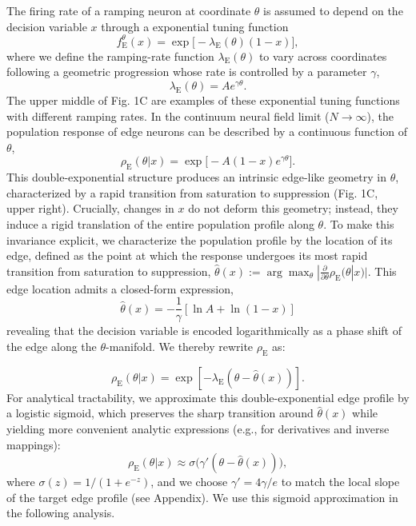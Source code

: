 \documentclass{article}
\newcommand{\rhoE}{\rho_{\text{E}}}
\newcommand{\lambdaE}{\lambda_{\text{E}}}
\newcommand{\gammaSig}{\gamma'}
\begin{document}
 The firing rate of a ramping neuron at coordinate $\theta$ is assumed to depend on the decision variable $x$ through a exponential tuning function
\begin{equation}
    f_{\text{E}}^{\theta}(x)=\exp\!\bigl[-\lambdaE(\theta)(1-x)\bigr],
\end{equation}
where we define the ramping-rate function $\lambdaE(\theta)$ to vary across coordinates following a geometric progression whose rate is controlled by a parameter $\gamma$,
\begin{equation}
   \lambdaE(\theta)=Ae^{\gamma\theta} \label{geometric progression}.
\end{equation}
The upper middle of Fig. 1C are examples of these exponential tuning functions with different ramping rates.
In the continuum neural field limit ($N\to \infty$), the population response of edge neurons can be described by a continuous function of $\theta$,
\begin{equation}
\rhoE(\theta|x)=\exp\!\bigl[-A(1-x)e^{\gamma\theta}\bigr].
\end{equation}
This double-exponential structure produces an intrinsic edge-like geometry in $\theta$, characterized by a rapid transition from saturation to suppression (Fig. 1C, upper right). Crucially, changes in $x$ do not deform this geometry; instead, they induce a rigid translation of the entire population profile along $\theta$. To make this invariance explicit, we characterize the population profile by the location of its edge, defined as the point at which the response undergoes its most rapid transition from saturation to suppression, $\hat{\theta}(x) :=\arg\max_{\theta}|\frac{\partial}{\partial \theta}\rhoE(\theta|x)|$. This edge location admits a closed-form expression,
\begin{equation}
\hat{\theta}(x) = -\frac1\gamma \left[\ln A + \ln(1-x)\right]\label{nonlinear mapping}
\end{equation}
revealing that the decision variable is encoded logarithmically as a phase shift of the edge along the $\theta$-manifold. We thereby rewrite $\rhoE$ as:

\begin{equation}
    \rhoE(\theta|x) = \exp\left[-\lambdaE(\theta-\hat{\theta}(x))\right]. 
\end{equation}
For analytical tractability, we approximate this double-exponential edge profile by a logistic sigmoid, which preserves the sharp transition around $\hat{\theta}(x)$ while yielding more convenient analytic expressions (e.g., for derivatives and inverse mappings):
\begin{equation}
    \rhoE(\theta|x) \approx \sigma\bigl(\gammaSig(\theta-\hat{\theta}(x))\bigr), \label{rhoE}
\end{equation}
where $\sigma(z)=1/(1+e^{-z})$, and we choose $\gammaSig=4\gamma/e$ to match the local slope of the target edge profile (see Appendix). We use this sigmoid approximation in the following analysis.
\end{document}
